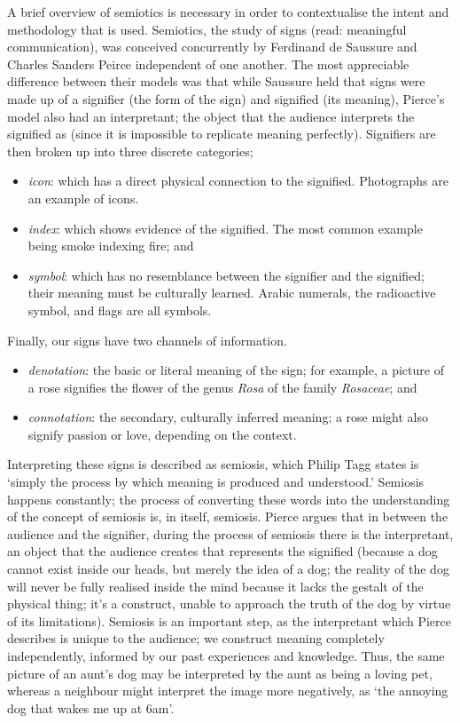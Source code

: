 A brief overview of semiotics is necessary in order to contextualise the intent and methodology that is used.
Semiotics, the study of signs (read: meaningful communication), was conceived concurrently by Ferdinand de Saussure and Charles Sanders Peirce independent of one another.
The most appreciable difference between their models was that while Saussure held that signs were made up of a signifier (the form of the sign) and signified (its meaning), Pierce's model also had an interpretant; the object that the audience interprets the signified as (since it is impossible to replicate meaning perfectly).
Signifiers are then broken up into three discrete categories; 
\begin{itemize}
\item \emph{\gls{icon}}: which has a direct physical connection to the signified. Photographs are an example of icons.
\item \emph{\gls{index}}: which shows evidence of the signified. The most common example being smoke indexing fire; and
\item \emph{\gls{symbol}}: which has no resemblance between the signifier and the signified; their meaning must be culturally learned. Arabic numerals, the radioactive symbol, and flags are all symbols.
\end{itemize}

Finally, our signs have two channels of information.
\begin{itemize}
\item \emph{\gls{denotation}}: the basic or literal meaning of the sign; for example, a picture of a rose signifies the flower of the genus \emph{Rosa} of the family \emph{Rosaceae}; and
\item \emph{\gls{connotation}}: the secondary, culturally inferred meaning; a rose might also signify passion or love, depending on the context.
\end{itemize}

Interpreting these signs is described as semiosis, which Philip Tagg states is `simply the process by which meaning is produced and understood.'\autocite[156]{taggMusicMeaningsModern2013}
Semiosis happens constantly; the process of converting these words into the understanding of the concept of semiosis is, in itself, semiosis. 
Pierce argues that in between the audience and the signifier, during the process of semiosis there is the interpretant, an object that the audience creates that represents the signified (because a dog cannot exist inside our heads, but merely the idea of a dog; the reality of the dog will never be fully realised inside the mind because it lacks the gestalt of the physical thing; 
it's a construct, unable to approach the truth of the dog by virtue of its limitations).
Semiosis is an important step, as the interpretant which Pierce describes is unique to the audience; we construct meaning completely independently, informed by our past experiences and knowledge.
Thus, the same picture of an aunt's dog may be interpreted by the aunt as being a loving pet, whereas a neighbour might interpret the image more negatively, as `the annoying dog that wakes me up at 6am'.

